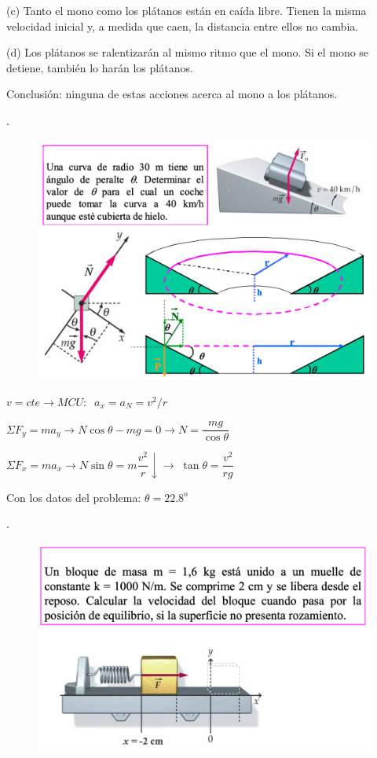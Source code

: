  (c) Tanto el mono como los plátanos están en caída libre. Tienen la misma velocidad inicial y, a medida que caen, la distancia entre ellos no cambia.

(d) Los plátanos se ralentizarán al mismo ritmo que el mono. Si el mono se detiene, también lo harán los plátanos.

Conclusión: ninguna de estas acciones acerca al mono a los plátanos.
 

\begin{prob}.
	\begin{figure}[H]
	\centering
	\includegraphics[width=.8\textwidth]{imagenes/imagenes03/T03IM28.png}
	\end{figure}
\end{prob}

\vspace{-4mm} $v=cte \to MCU: \;\; a_x=a_N= {v^2} / r$

$\Sigma F_y=m a_y \to N \cos \theta - mg =0 \to N=\dfrac {mg}{\cos \theta}$

$\Sigma F_x=m a_x\to N \sin \theta = m \dfrac {v^2} r \downarrow \to \;\tan \theta =\dfrac{v^2}{rg}$

Con los datos del problema: $\theta = 22.8^o$






\begin{prob}.
	\begin{figure}[H]
	\centering
	\includegraphics[width=.75\textwidth]{imagenes/imagenes03/T03IM32.png}
	\end{figure}
\end{prob}

